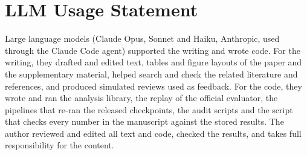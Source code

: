 \section*{LLM Usage Statement}
Large language models (Claude Opus, Sonnet and Haiku, Anthropic, used through the Claude Code
agent) supported the writing and wrote code. For the writing, they drafted and edited text,
tables and figure layouts of the paper and the supplementary material, helped search and check
the related literature and references, and produced simulated reviews used as feedback. For the
code, they wrote and ran the analysis library, the replay of the official evaluator, the
pipelines that re-ran the released checkpoints, the audit scripts and the script that checks
every number in the manuscript against the stored results. The author reviewed and edited all
text and code, checked the results, and takes full responsibility for the content.
